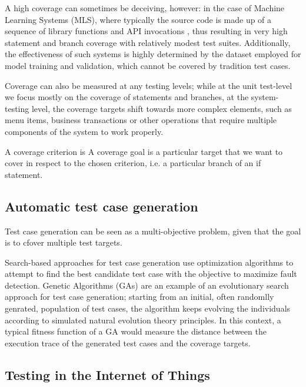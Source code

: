 A high coverage can sometimes be deceiving, however: in the case of Machine Learning Systems (MLS), where typically the source code is made up 
of a sequence of library functions and API invocations \cite{article2}, thus resulting in very high statement and branch coverage with relatively modest
test suites.
Additionally, the effectiveness of such systems is highly determined by the dataset employed for model training and validation, which
cannot be covered by tradition test cases.

Coverage can also be measured at any testing levels; while at the unit test-level we focus mostly on the coverage of statements and branches,
at the system-testing level, the coverage targets shift towards more complex elements, such as menu items, business transactions or other
operations that require multiple components of the system to work properly.

A coverage criterion is 
A coverage goal is a particular target that we want to cover in respect to the chosen criterion, i.e. a particular branch of an if statement.

\subsection*{Automatic test case generation}
Test case generation can be seen as a multi-objective problem, given that the goal is to cfover multiple test targets.

Search-based approaches for test case generation use optimization algorithms to attempt to find 
the best candidate test case with the objective to maximize fault detection. Genetic Algorithms (GAs) are an example of an
evolutionary search approach for test case generation; starting from an initial, often randomlly genrated, population of 
test cases, the algorithm keeps evolving the individuals according to simulated natural evolution theory principles.
In this context, a typical fitness function of a GA would measure the distance between the execution trace of the generated test cases
and the coverage targets.


\subsection*{Testing in the Internet of Things}